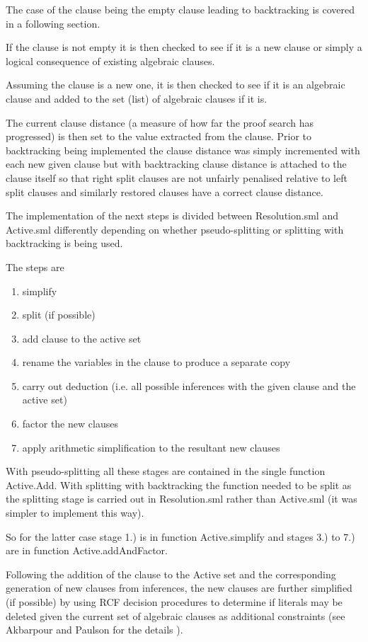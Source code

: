 \documentclass[11pt, oneside]{article}   	%
\begin{document}
The case of the clause being the empty clause leading to backtracking is covered in a following section.

If the clause is not empty it is then checked to see if it is a new clause or simply a logical consequence of existing algebraic clauses.

Assuming the clause is a new one, it is then checked to see if it is an algebraic clause and added to the set (list) of algebraic clauses if it is.

The current clause distance (a measure of how far the proof search has progressed) is then set to the value extracted from the clause. Prior to backtracking being implemented the
clause distance was simply incremented with each new given clause but with backtracking clause distance is attached to the clause itself so that right split clauses are not unfairly
penalised relative to left split clauses and similarly restored clauses have a correct clause distance.

The implementation of the next steps is divided between Resolution.sml and Active.sml differently depending on whether pseudo-splitting or splitting with backtracking is being used.

The steps are
\begin{enumerate}
\item simplify
\item split (if possible)
\item add clause to the active set
\item rename the variables in the clause to produce a separate copy
\item carry out deduction (i.e. all possible inferences with the given clause and the active set)
\item factor the new clauses
\item apply arithmetic simplification to the resultant new clauses
\end{enumerate}

With pseudo-splitting all these stages are contained in the single function Active.Add. With splitting with backtracking the function needed to be split as the splitting stage is carried out in Resolution.sml rather
than Active.sml (it was simpler to implement this way).

So for the latter case stage 1.) is in function Active.simplify and stages 3.) to 7.) are in function Active.addAndFactor.

Following the addition of the clause to the Active set and the corresponding generation of new clauses from inferences, the new clauses are further simplified (if possible) by using RCF decision procedures
to determine if literals may be deleted given the current set of algebraic clauses as additional constraints (see Akbarpour and Paulson for the details \cite{MT}).
\end{document}
